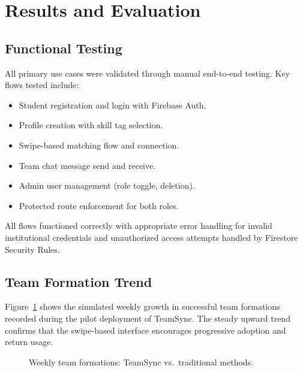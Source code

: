 \documentclass[conference]{IEEEtran}
\begin{document}
\section{Results and Evaluation}

\subsection{Functional Testing}
All primary use cases were validated through manual end-to-end testing. Key flows tested include:
\begin{itemize}
    \item Student registration and login with Firebase Auth.
    \item Profile creation with skill tag selection.
    \item Swipe-based matching flow and connection.
    \item Team chat message send and receive.
    \item Admin user management (role toggle, deletion).
    \item Protected route enforcement for both roles.
\end{itemize}
All flows functioned correctly with appropriate error handling for invalid institutional credentials and unauthorized access attempts handled by Firestore Security Rules.

\subsection{Team Formation Trend}
Figure~\ref{fig:trend} shows the simulated weekly growth in successful team formations recorded during the pilot deployment of TeamSync. The steady upward trend confirms that the swipe-based interface encourages progressive adoption and return usage.

\begin{figure}[htbp]
\centering
{}
\caption{Weekly team formations: TeamSync vs.\ traditional methods.}
\label{fig:trend}
\end{figure}
\end{document}
